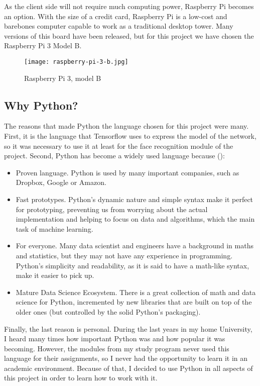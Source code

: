 	As the client side will not require much computing power, Raspberry Pi becomes an option. With the size of a credit card, Raspberry Pi is a low-cost and barebones computer capable to work as a traditional desktop tower. Many versions of this board have been released, but for this project we have chosen the Raspberry Pi 3 Model B.

	\begin{figure}[ht]
		\centering
		\texttt{[image: raspberry-pi-3-b.jpg]}
		\caption{Raspberry Pi 3, model B}
	\end{figure}

	\subsection{Why Python?}
	The reasons that made Python the language chosen for this project were many. First, it is the language that Tensorflow uses to express the model of the network, so it was necessary to use it at least for the face recognition module of the project. Second, Python has become a widely used language because (\cite{why_python}):

	\begin{itemize}
		\item Proven language. Python is used by many important companies, such as Dropbox, Google or Amazon. 
		\item Fast prototypes. Python's dynamic nature and simple syntax make it perfect for prototyping, preventing us from worrying about the actual implementation and helping to focus on data and algorithms, which the main task of machine learning.
		\item For everyone. Many data scientist and engineers have a background in maths and statistics, but they may not have any experience in programming. Python's simplicity and readability, as it is said to have a math-like syntax, make it easier to pick up.
		\item Mature Data Science Ecosystem. There is a great collection of math and data science for Python, incremented by new libraries that are built on top of the older ones (but controlled by the solid Python's packaging). 
	\end{itemize}

	Finally, the last reason is personal. During the last years in my home University, I heard many times how important Python was and how popular it was becoming. However, the modules from my study program never used this language for their assignments, so I never had the opportunity to learn it in an academic environment. Because of that, I decided to use Python in all aspects of this project in order to learn how to work with it.  

